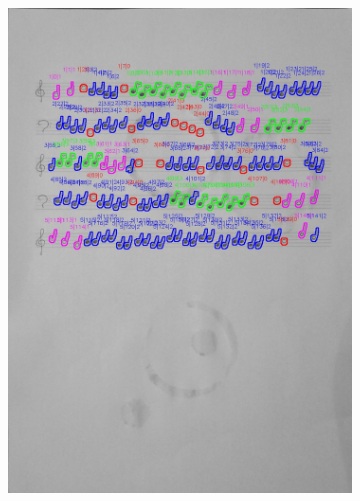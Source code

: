 \documentclass[11pt]{article}
\begin{document}
\begin{figure}[H]
\begin{subfigure}{.5\textwidth}
        \includegraphics[width=\linewidth]{16_cnts.jpg}
        \label{fig:sub2}
    \end{subfigure}
    \label{fig:test}
\end{figure}
\end{document}
